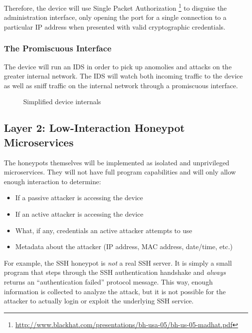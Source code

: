 Therefore, the device will use Single Packet Authorization
\footnote{\url{http://www.blackhat.com/presentations/bh-usa-05/bh-us-05-madhat.pdf}}
to disguise the administration interface, only opening the port for a single
connection to a particular IP address when presented with valid cryptographic
credentials.

\subsubsection{The Promiscuous Interface}

The device will run an IDS in order to pick up anomolies and attacks on
the greater internal network. The IDS will watch both incoming traffic to
the device as well as sniff traffic on the internal network through a
promiscuous interface.

\begin{figure}
\centering
{

}
\caption{Simplified device internals}
\label{figure:device}
\end{figure}
 

\subsection{Layer 2: Low-Interaction Honeypot Microservices}

The honeypots themselves will be implemented as isolated and unprivileged
microservices. They will not have full program capabilities and will only
allow enough interaction to determine:

\begin{itemize}
    \item If a passive attacker is accessing the device
    \item If an active attacker is accessing the device
    \item What, if any, credentials an active attacker attempts to use
    \item Metadata about the attacker (IP address, MAC address, date/time, etc.)
\end{itemize}

For example, the SSH honeypot is \textit{not} a real SSH server. It is simply
a small program that steps through the SSH authentication handshake and
\textit{always} returns an ``authentication failed'' protocol message. This
way, enough information is collected to analyze the attack, but it is not
possible for the attacker to actually login or exploit the underlying
SSH service.

